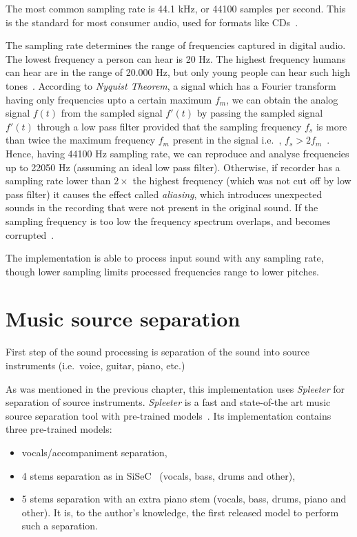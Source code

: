 The most common sampling rate is 44.1 kHz, or 44100 samples per second. This is the standard for most consumer audio,
used for formats like CDs~\cite{digital-audio-basics}.

The sampling rate determines the range of frequencies captured in digital audio. The lowest frequency a person can hear
is 20 Hz. The highest frequency humans can hear are in the range of 20.000 Hz, but only young people can hear such high
tones~\cite{roots-of-modern-technology}. According to \textit{Nyquist Theorem}, a signal which has a Fourier transform
having only frequencies upto a certain maximum $f_m$, we can obtain the analog signal $f(t)$ from the sampled signal
$f'(t)$ by passing the sampled signal $f'(t)$ through a low pass filter provided that the sampling frequency $f_s$ is
more than twice the maximum frequency $f_m$ present in the signal i.e.\ , $f_s > 2f_m$~\cite{signals-and-systems}. Hence,
having 44100 Hz sampling rate, we can reproduce and analyse frequencies up to 22050 Hz (assuming an ideal low pass
filter). Otherwise, if recorder has a sampling rate lower than $2\times$ the highest frequency (which was not cut off
by low pass filter) it causes the effect called \textit{aliasing}, which introduces unexpected sounds in the recording
that were not present in the original sound. If the sampling frequency is too low the frequency spectrum overlaps, and
becomes corrupted~\cite{signals-and-systems}.

The implementation is able to process input sound with any sampling rate, though lower sampling limits processed
frequencies range to lower pitches.

\pagebreak

\section{Music source separation}\label{sec:music-source-separation}

First step of the sound processing is separation of the sound into source instruments (i.e.\ voice, guitar, piano,
etc.)

As was mentioned in the previous chapter, this implementation uses \textit{Spleeter} for separation of source
instruments. \textit{Spleeter} is a fast and state-of-the art music source separation tool with pre-trained
models~\cite{spleeter2019}. Its implementation contains three pre-trained models:

\begin{itemize}
	\item vocals/accompaniment separation,
	\item 4 stems separation as in \ac{SiSeC}~\cite{stter20182018} (vocals, bass, drums and other),
	\item 5 stems separation with an extra piano stem (vocals, bass, drums, piano and other). It is, to the author's
	knowledge, the first released model to perform such a separation.
\end{itemize}

